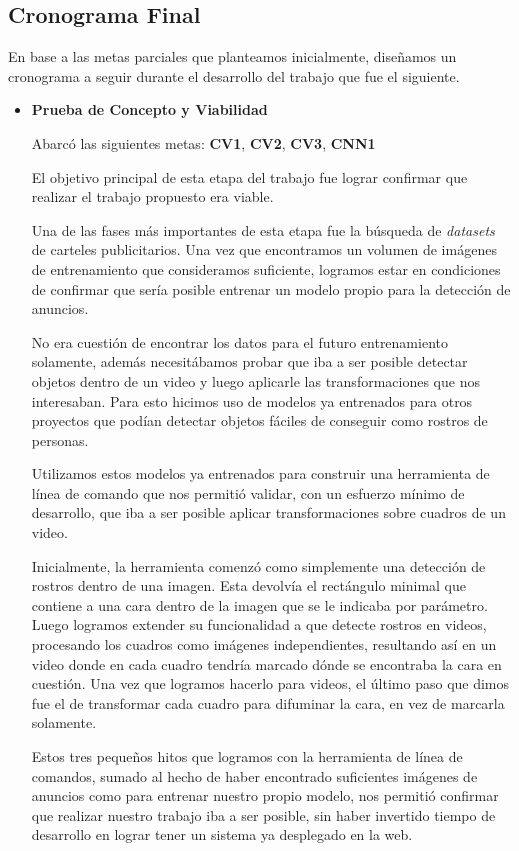 \documentclass[a4paper]{article}
\begin{document}
\subsection{Cronograma Final}

En base a las metas parciales que planteamos inicialmente, diseñamos un cronograma a seguir durante el desarrollo del trabajo que fue el siguiente.

\begin{itemize}
\item \textbf{Prueba de Concepto y Viabilidad}

Abarcó las siguientes metas: \textbf{CV1}, \textbf{CV2}, \textbf{CV3}, \textbf{CNN1} \medskip

El objetivo principal de esta etapa del trabajo fue lograr confirmar que realizar el trabajo propuesto era viable.

Una de las fases más importantes de esta etapa fue la búsqueda de \textit{datasets} de carteles publicitarios. Una vez que encontramos un volumen de imágenes de entrenamiento que consideramos suficiente, logramos estar en condiciones de confirmar que sería posible entrenar un modelo propio para la detección de anuncios.

No era cuestión de encontrar los datos para el futuro entrenamiento solamente, además necesitábamos probar que iba a ser posible detectar objetos dentro de un video y luego aplicarle las transformaciones que nos interesaban. Para esto hicimos uso de modelos ya entrenados para otros proyectos que podían detectar objetos fáciles de conseguir como rostros de personas.

Utilizamos estos modelos ya entrenados para construir una herramienta de línea de comando que nos permitió validar, con un esfuerzo mínimo de desarrollo, que iba a ser posible aplicar transformaciones sobre cuadros de un video.

Inicialmente, la herramienta comenzó como simplemente una detección de rostros dentro de una imagen. Esta devolvía el rectángulo minimal que contiene a una cara dentro de la imagen que se le indicaba por parámetro.
Luego logramos extender su funcionalidad a que detecte rostros en videos, procesando los cuadros como imágenes independientes, resultando así en un video donde en cada cuadro tendría marcado dónde se encontraba la cara en cuestión.
Una vez que logramos hacerlo para videos, el último paso que dimos fue el de transformar cada cuadro para difuminar la cara, en vez de marcarla solamente.

Estos tres pequeños hitos que logramos con la herramienta de línea de comandos, sumado al hecho de haber encontrado suficientes imágenes de anuncios como para entrenar nuestro propio modelo, nos permitió confirmar que realizar nuestro trabajo iba a ser posible, sin haber invertido tiempo de desarrollo en lograr tener un sistema ya desplegado en la web.


\end{itemize}
\end{document}
